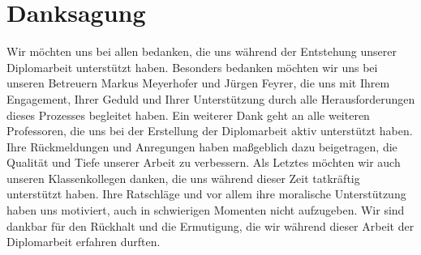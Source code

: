 \chapter*{Danksagung} 

Wir möchten uns bei allen bedanken, die uns während der Entstehung unserer Diplomarbeit unterstützt haben. Besonders bedanken möchten wir uns bei unseren Betreuern Markus Meyerhofer und Jürgen Feyrer, die uns mit Ihrem Engagement, Ihrer Geduld und Ihrer Unterstützung durch alle Herausforderungen dieses Prozesses begleitet haben. Ein weiterer Dank geht an alle weiteren Professoren, die uns bei der Erstellung der Diplomarbeit aktiv unterstützt haben. Ihre Rückmeldungen und Anregungen haben maßgeblich dazu beigetragen, die Qualität und Tiefe unserer Arbeit zu verbessern. Als Letztes möchten wir auch unseren Klassenkollegen danken, die uns während dieser Zeit tatkräftig unterstützt haben. Ihre Ratschläge und vor allem ihre moralische Unterstützung haben uns motiviert, auch in schwierigen Momenten nicht aufzugeben. Wir sind dankbar für den Rückhalt und die Ermutigung, die wir während dieser Arbeit der Diplomarbeit erfahren durften.